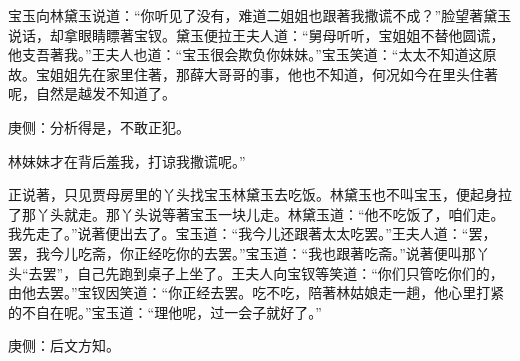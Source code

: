 \begin{parag}
    宝玉向林黛玉说道：“你听见了没有，难道二姐姐也跟著我撒谎不成？”脸望著黛玉说话，却拿眼睛瞟著宝钗。黛玉便拉王夫人道：“舅母听听，宝姐姐不替他圆谎，他支吾著我。”王夫人也道：“宝玉很会欺负你妹妹。”宝玉笑道：“太太不知道这原故。宝姐姐先在家里住著，那薛大哥哥的事，他也不知道，何况如今在里头住著呢，自然是越发不知道了。\begin{note}庚侧：分析得是，不敢正犯。\end{note}林妹妹才在背后羞我，打谅我撒谎呢。”
\end{parag}


\begin{parag}
    正说著，只见贾母房里的丫头找宝玉林黛玉去吃饭。林黛玉也不叫宝玉，便起身拉了那丫头就走。那丫头说等著宝玉一块儿走。林黛玉道：“他不吃饭了，咱们走。我先走了。”说著便出去了。宝玉道：“我今儿还跟著太太吃罢。”王夫人道：“罢，罢，我今儿吃斋，你正经吃你的去罢。”宝玉道：“我也跟著吃斋。”说著便叫那丫头“去罢”，自己先跑到桌子上坐了。王夫人向宝钗等笑道：“你们只管吃你们的，由他去罢。”宝钗因笑道：“你正经去罢。吃不吃，陪著林姑娘走一趟，他心里打紧的不自在呢。”宝玉道：“理他呢，过一会子就好了。”\begin{note}庚侧：后文方知。\end{note}
\end{parag}



